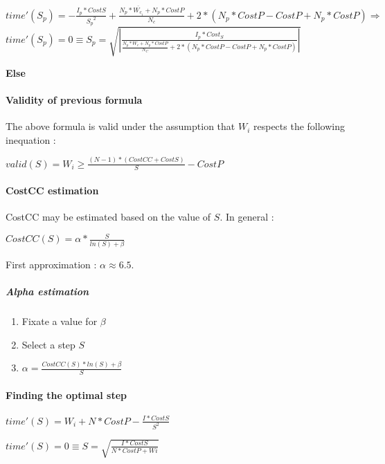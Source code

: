 \documentclass[a4paper,11pt]{article}
\begin{document}
    $ time'(S_p) = - \frac{I_p * CostS}{{S_p}^{2}} + \frac{N_p * \overline{W_{c_i}} + N_p * CostP}{N_c} + 2 * (N_p * CostP - CostP + N_p * CostP) \Rightarrow $\\
    $ time'(S_p) = 0 \equiv S_p = \sqrt{\left | \frac{I_p * Cost_S}{\frac{N_p * W_c + N_p * CostP}{N_C} + 2 * (N_p * CostP - CostP + N_p * CostP)} \right | } $ 

    \medskip
\noindent \textbf{Else}


    
\medskip

\paragraph{Validity of previous formula}
The above formula is valid under the assumption that $ W_i $ respects the following inequation : 

    $ valid(S) = W_i \geq \frac{(N - 1) * (CostCC + CostS)}{S} - CostP $

\paragraph{CostCC estimation}

CostCC may be estimated based on the value of $ S $. In general :

$ CostCC(S) = \alpha * \frac{S}{ln(S) + \beta} $

First approximation : $ \alpha \approx 6.5 $.

\subparagraph{Alpha estimation}

\begin{enumerate}
    \item Fixate a value for $ \beta $
    \item Select a step $ S $
    \item $ \alpha = \frac{CostCC(S) * ln(S) + \beta}{S} $
\end{enumerate}

\paragraph{Finding the optimal step}

$ time'(S) = W_i + N * CostP - \frac{I * CostS}{S^2} $

$ time'(S) = 0 \equiv S = \sqrt{\frac{I * CostS}{N * CostP + Wi}} $
\end{document}
